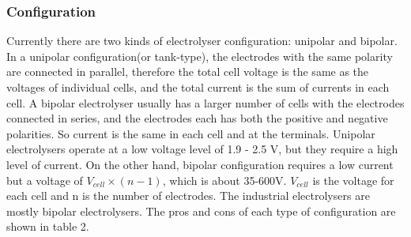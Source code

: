 
\subsubsection{Configuration} 
Currently there are two kinds of electrolyser configuration: unipolar and bipolar. In a unipolar configuration(or tank-type), the electrodes with the same polarity are connected in parallel, therefore the total cell voltage is the same as the voltages of individual cells, and the total current is the sum of currents in each cell. A bipolar electrolyser usually has a larger number of cells with the electrodes connected in series, and the electrodes each has both the positive and negative polarities. So current is the same in each cell and at the terminals. Unipolar electrolysers operate at a low voltage level of 1.9 - 2.5 V, but they require a high level of current. On the other hand, bipolar configuration requires a low current but a voltage of $V_{cell} \times (n-1)$, which is about 35-600V. $V_{cell}$ is the voltage for each cell and n is the number of electrodes. The industrial electrolysers are mostly bipolar electrolysers.
The pros and cons of each type of configuration are shown in table 2.


